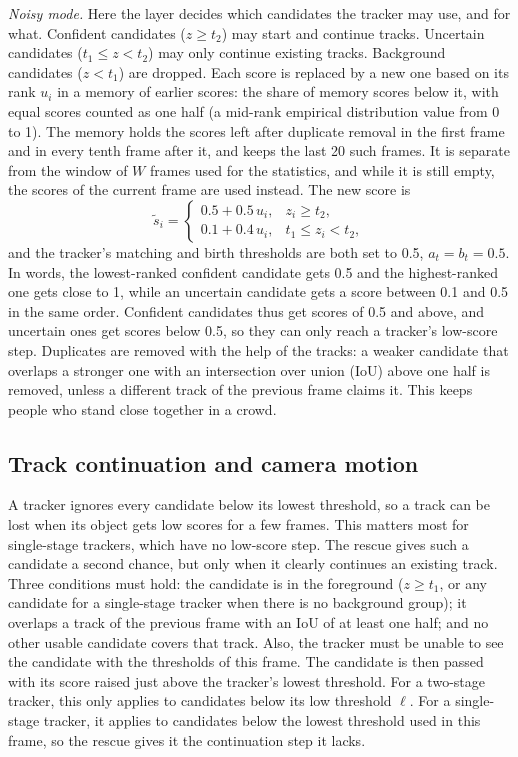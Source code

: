 \documentclass[pdflatex,sn-mathphys-num]{sn-jnl}
\begin{document}
\emph{Noisy mode.} Here the layer decides which candidates the tracker may
use, and for what. Confident candidates ($z\ge t_2$) may start and continue
tracks. Uncertain candidates ($t_1\le z<t_2$) may only continue existing
tracks. Background candidates ($z<t_1$) are dropped. Each score is replaced
by a new one based on its rank $u_i$ in a memory of earlier scores: the share
of memory scores below it, with equal scores counted as one half (a mid-rank
empirical distribution value from 0 to 1). The memory holds the scores left
after duplicate removal in the first frame and in every tenth frame after it,
and keeps the last 20 such frames. It is separate from the window of $W$
frames used for the statistics, and while it is still empty, the scores of the
current frame are used instead. The new score is
\begin{equation}
\tilde{s}_i=
\begin{cases}
0.5+0.5\,u_i, & z_i\ge t_2,\\
0.1+0.4\,u_i, & t_1\le z_i<t_2,
\end{cases}
\label{eq:remap}
\end{equation}
and the tracker's matching and birth thresholds are both set to 0.5,
$a_t=b_t=0.5$. In words, the lowest-ranked confident candidate gets 0.5 and
the highest-ranked one gets close to 1, while an uncertain candidate gets a
score between 0.1 and 0.5 in the same order. Confident candidates thus get
scores of 0.5 and above, and
uncertain ones get scores below 0.5, so they can only reach a tracker's
low-score step. Duplicates are removed with the help of the tracks: a weaker
candidate that overlaps a stronger one with an intersection over union (IoU)
above one half is removed, unless a different track of the previous frame
claims it. This keeps people who stand close together in a crowd.

\subsection{Track continuation and camera motion}\label{sec:rescue}
A tracker ignores every candidate below its lowest threshold, so a track can
be lost when its object gets low scores for a few frames. This matters most
for single-stage trackers, which have no low-score step. The rescue gives
such a candidate a second chance, but only when it clearly continues an
existing track. Three conditions must hold: the candidate is in the
foreground ($z\ge t_1$, or any candidate for a single-stage tracker when
there is no background group); it overlaps a track of the previous frame
with an IoU of at least one half; and no other usable candidate covers that
track. Also, the tracker must be unable to see the candidate with the
thresholds of this frame. The candidate is then passed with its score raised
just above the tracker's lowest threshold. For a two-stage tracker, this only
applies to candidates below its low threshold $\ell$. For a single-stage
tracker, it applies to candidates below the lowest threshold used in this
frame, so the rescue gives it the continuation step it lacks.
\end{document}
